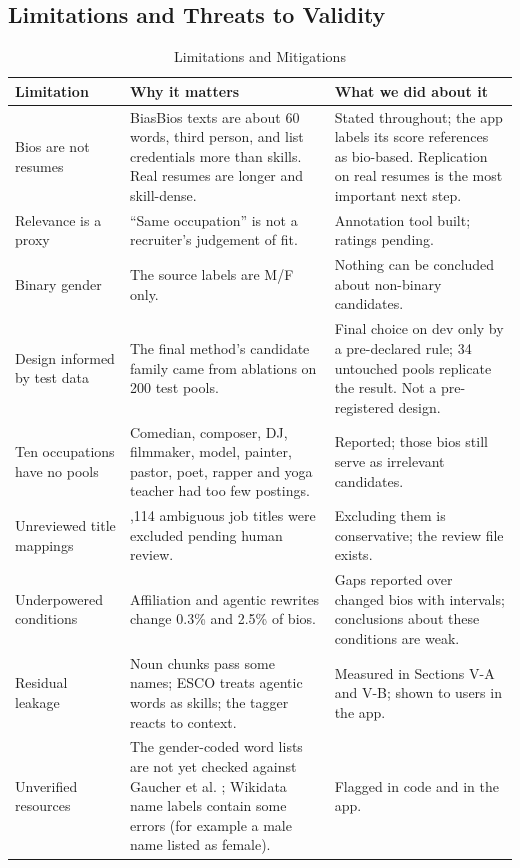 \documentclass[conference,a4paper]{IEEEtran}
\begin{document}
\subsection{Limitations and Threats to Validity}
\begin{table}[!t]
\caption{Limitations and Mitigations}
\label{tab:23}
\centering
\footnotesize
\begin{tabularx}{\textwidth}{>{\raggedright\arraybackslash}X>{\raggedright\arraybackslash}X>{\raggedright\arraybackslash}X}
\hline
\textbf{Limitation} & \textbf{Why it matters} & \textbf{What we did about it} \\
\hline
Bios are not resumes & BiasBios texts are about 60 words, third person, and list credentials more than skills. Real resumes are longer and skill-dense. & Stated throughout; the app labels its score references as bio-based. Replication on real resumes is the most important next step. \\
Relevance is a proxy & ``Same occupation'' is not a recruiter's judgement of fit. & Annotation tool built; ratings pending. \\
Binary gender & The source labels are M/F only. & Nothing can be concluded about non-binary candidates. \\
Design informed by test data & The final method's candidate family came from ablations on 200 test pools. & Final choice on dev only by a pre-declared rule; 34 untouched pools replicate the result. Not a pre-registered design. \\
Ten occupations have no pools & Comedian, composer, DJ, filmmaker, model, painter, pastor, poet, rapper and yoga teacher had too few postings. & Reported; those bios still serve as irrelevant candidates. \\
Unreviewed title mappings & 1,114 ambiguous job titles were excluded pending human review. & Excluding them is conservative; the review file exists. \\
Underpowered conditions & Affiliation and agentic rewrites change 0.3\% and 2.5\% of bios. & Gaps reported over changed bios with intervals; conclusions about these conditions are weak. \\
Residual leakage & Noun chunks pass some names; ESCO treats agentic words as skills; the tagger reacts to context. & Measured in Sections V-A and V-B; shown to users in the app. \\
Unverified resources & The gender-coded word lists are not yet checked against Gaucher et al. \cite{gaucher}; Wikidata name labels contain some errors (for example a male name listed as female). & Flagged in code and in the app. \\

\end{tabularx}
\end{table}
\end{document}
